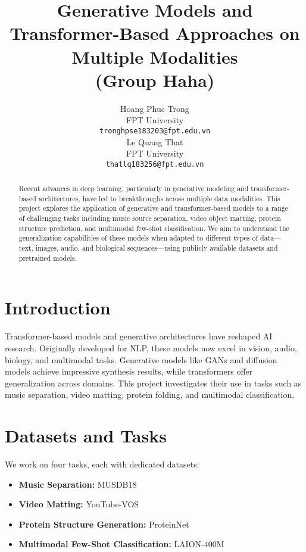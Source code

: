 \documentclass{article}
\title{Generative Models and Transformer-Based Approaches on Multiple Modalities \\
\large (Group Haha)}
\author{
  Hoang Phuc Trong \\
  FPT University \\
  \texttt{tronghpse183203@fpt.edu.vn} \\
  \And
  Le Quang That \\
  FPT University \\
  \texttt{thatlq183256@fpt.edu.vn} \\
}
\begin{document}
\maketitle

\begin{abstract}
Recent advances in deep learning, particularly in generative modeling and transformer-based architectures, have led to breakthroughs across multiple data modalities. This project explores the application of generative and transformer-based models to a range of challenging tasks including music source separation, video object matting, protein structure prediction, and multimodal few-shot classification. We aim to understand the generalization capabilities of these models when adapted to different types of data—text, images, audio, and biological sequences—using publicly available datasets and pretrained models.
\end{abstract}

\section{Introduction}

Transformer-based models and generative architectures have reshaped AI research. Originally developed for NLP, these models now excel in vision, audio, biology, and multimodal tasks. Generative models like GANs and diffusion models achieve impressive synthesis results, while transformers offer generalization across domains. This project investigates their use in tasks such as music separation, video matting, protein folding, and multimodal classification.

\section{Datasets and Tasks}

We work on four tasks, each with dedicated datasets:

\begin{itemize}
    \item \textbf{Music Separation:} MUSDB18~\cite{musdb18}
    \item \textbf{Video Matting:} YouTube-VOS~\cite{xu2018youtubevos}
    \item \textbf{Protein Structure Generation:} ProteinNet~\cite{alquraishi2019prot}
    \item \textbf{Multimodal Few-Shot Classification:} LAION-400M~\cite{schuhmann2021laion400m}
\end{itemize}
\end{document}
